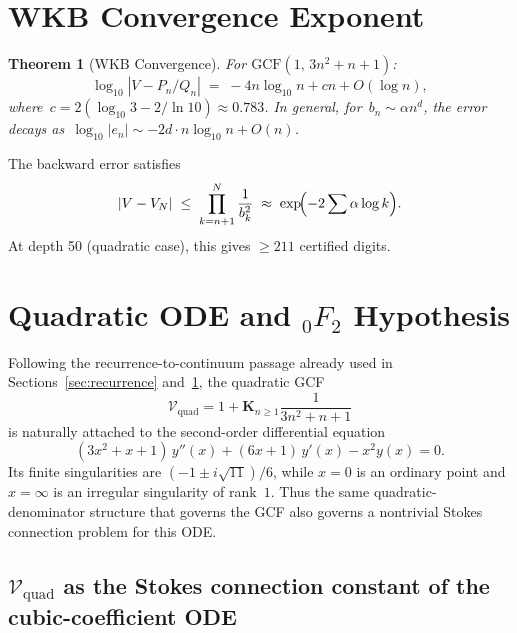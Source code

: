 \documentclass[11pt,a4paper]{article}
\newtheorem{theorem}{Theorem}
\begin{document}
\section{WKB Convergence Exponent}\label{sec:wkb}

\begin{theorem}[WKB Convergence]\label{thm:wkb}
For $\mathrm{GCF}(1,\, 3n^2+n+1)$:
\begin{equation}\label{eq:wkb}
  \log_{10}|V - P_n/Q_n| \;=\; -4n\log_{10}n + cn + O(\log n),
\end{equation}
where~$c = 2(\log_{10}3 - 2/\ln 10) \approx 0.783$. In general, for~$b_n \sim \alpha n^d$, the error decays as~$\log_{10}|e_n| \sim -2d\cdot n\log_{10}n + O(n)$.
\end{theorem}

The backward error satisfies
\[
  |V - V_N| \;\leq\; \prod_{k=n+1}^{N}\frac{1}{b_k^2} \;\approx\; \exp\!\Bigl(-2\sum \alpha\log k\Bigr).
\]
At depth 50 (quadratic case), this gives $\geq 211$ certified digits.

\section{Quadratic ODE and \texorpdfstring{${}_0F_2$}{0F2} Hypothesis}\label{sec:ode}

Following the recurrence-to-continuum passage already used in
Sections~\ref{sec:recurrence} and~\ref{sec:wkb}, the quadratic GCF
\[
  \mathcal{V}_{\mathrm{quad}}
  = 1 + \mathbf{K}_{n\ge 1}\frac{1}{3n^2+n+1}
\]
is naturally attached to the second-order differential equation
\[
  (3x^2+x+1)\,y''(x) + (6x+1)\,y'(x) - x^2 y(x) = 0.
\]
Its finite singularities are $(-1\pm i\sqrt{11})/6$, while $x=0$ is an
ordinary point and $x=\infty$ is an irregular singularity of rank~$1$.
Thus the same quadratic-denominator structure that governs the GCF also
governs a nontrivial Stokes connection problem for this ODE.

\subsection{\texorpdfstring{$\mathcal{V}_{\mathrm{quad}}$}{V_quad} as the Stokes connection constant of the cubic-coefficient ODE}\label{subsec:vquad-stokes-connection}
\end{document}
